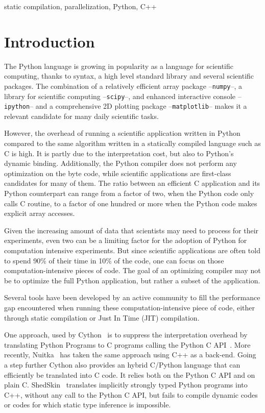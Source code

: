 \documentclass[10pt, onecolumn, preprint]{sigplanconf}
\begin{document}
\keywords
static compilation, parallelization, Python, C++


\section{Introduction}

The Python language is growing in popularity as a language for scientific
computing, thanks to %
syntax, a high level standard library and several scientific packages. The
combination of a relatively efficient array package --\texttt{numpy}--, a
library for scientific computing --\texttt{scipy}--, and enhanced interactive
console --\texttt{ipython}-- and a comprehensive 2D plotting package
--\texttt{matplotlib}-- makes it a relevant candidate for many daily scientific
tasks.

However, the overhead of running a scientific application written in Python
compared to the same algorithm written in a statically compiled language such
as C is high. It is partly due to the interpretation cost, but also to Python's
dynamic binding. Additionally, the Python compiler does not perform any
optimization on the byte code, while scientific applications are first-class
candidates for many of them. The ratio between an efficient C application and
its Python counterpart can range from a factor of two, when the Python code
only calls C routine, to a factor of one hundred or more when the Python code
makes explicit array accesses.

Given the increasing amount of data that scientists may need to process for
their experiments, even two can be a limiting factor for the adoption of Python
for computation intensive experiments. But since scientific applications are
often told to spend 90\% of their time in 10\% of the code, one can focus on
those computation-intensive pieces of code. The goal of an optimizing compiler
may not be to optimize the full Python application, but rather a subset of the
application.

Several tools have been developed by an active community to fill the performance
gap encountered when running these computation-intensive piece of code, either
through static compilation or Just In Time (JIT) compilation.

One approach, used by Cython~\cite{cython2010} is to suppress the interpretation
overhead by translating Python Programs to C programs calling the Python C
API~\cite{pythoncapi}. More recently, Nuitka~\cite{nuitka}  has taken the same
approach using C++ as a back-end. Going a step further Cython also provides an
hybrid C/Python language that can efficiently be translated into C code. It 
relies both on the Python C API and on plain C.
ShedSkin~\cite{shedskin2006} translates implicitly strongly typed Python programs
into C++, without any call to the Python C API, but fails to compile dynamic
codes or codes for which static type inference is impossible.
\end{document}
